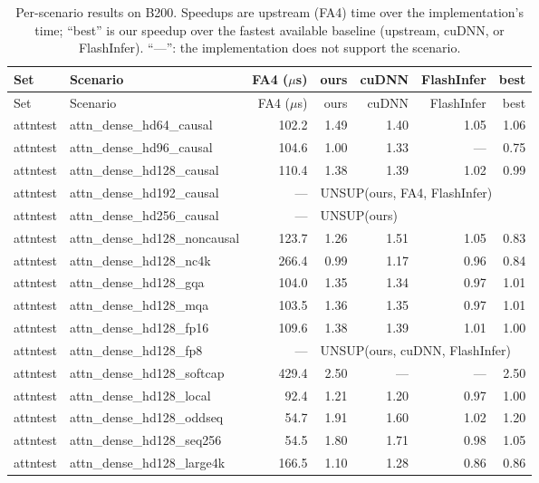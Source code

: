 \begin{longtable}{@{}llrrrrr@{}}
\caption{Per-scenario results on B200. Speedups are upstream (FA4) time over the implementation's time; ``best'' is our speedup over the fastest available baseline (upstream, cuDNN, or FlashInfer). ``---'': the implementation does not support the scenario.}\label{tab:per-scenario-blackwell}\\
\toprule Set & Scenario & FA4 ($\mu$s) & ours & cuDNN & FlashInfer & best \\ \midrule \endfirsthead
\toprule Set & Scenario & FA4 ($\mu$s) & ours & cuDNN & FlashInfer & best \\ \midrule \endhead
\bottomrule \endfoot
attntest & attn\_dense\_hd64\_causal & 102.2 & 1.49 & 1.40 & 1.05 & 1.06 \\
attntest & attn\_dense\_hd96\_causal & 104.6 & 1.00 & 1.33 & --- & 0.75 \\
attntest & attn\_dense\_hd128\_causal & 110.4 & 1.38 & 1.39 & 1.02 & 0.99 \\
attntest & attn\_dense\_hd192\_causal & --- & \multicolumn{4}{l}{UNSUP({ours, FA4, FlashInfer})} \\
attntest & attn\_dense\_hd256\_causal & --- & \multicolumn{4}{l}{UNSUP({ours})} \\
attntest & attn\_dense\_hd128\_noncausal & 123.7 & 1.26 & 1.51 & 1.05 & 0.83 \\
attntest & attn\_dense\_hd128\_nc4k & 266.4 & 0.99 & 1.17 & 0.96 & 0.84 \\
attntest & attn\_dense\_hd128\_gqa & 104.0 & 1.35 & 1.34 & 0.97 & 1.01 \\
attntest & attn\_dense\_hd128\_mqa & 103.5 & 1.36 & 1.35 & 0.97 & 1.01 \\
attntest & attn\_dense\_hd128\_fp16 & 109.6 & 1.38 & 1.39 & 1.01 & 1.00 \\
attntest & attn\_dense\_hd128\_fp8 & --- & \multicolumn{4}{l}{UNSUP({ours, cuDNN, FlashInfer})} \\
attntest & attn\_dense\_hd128\_softcap & 429.4 & 2.50 & --- & --- & 2.50 \\
attntest & attn\_dense\_hd128\_local & 92.4 & 1.21 & 1.20 & 0.97 & 1.00 \\
attntest & attn\_dense\_hd128\_oddseq & 54.7 & 1.91 & 1.60 & 1.02 & 1.20 \\
attntest & attn\_dense\_hd128\_seq256 & 54.5 & 1.80 & 1.71 & 0.98 & 1.05 \\
attntest & attn\_dense\_hd128\_large4k & 166.5 & 1.10 & 1.28 & 0.86 & 0.86 \\

\end{longtable}

